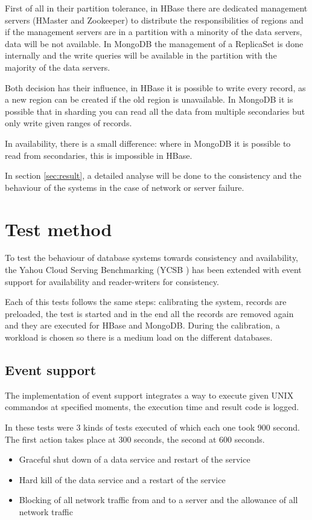 \documentclass[final,5p,times]{elsarticle}
\begin{document}
First of all in their partition tolerance, in HBase there are dedicated management servers (HMaster and Zookeeper) to distribute the responsibilities of regions and if the management servers are in a partition with a minority of the data servers, data will be not available. In MongoDB the management of a ReplicaSet is done internally and the write queries will be available in the partition with the majority of the data servers.

Both decision has their influence, in HBase it is possible to write every record, as a new region can be created if the old region is unavailable. In MongoDB it is possible that in sharding you can read all the data from multiple secondaries but only write given ranges of records.

In availability, there is a small difference: where in MongoDB it is possible to read from secondaries, this is impossible in HBase. 

In section \ref{sec:result}, a detailed analyse will be done to the consistency and the behaviour of the systems in the case of network or server failure. 

\section{Test method}
To test the behaviour of database systems towards consistency and availability, the Yahou Cloud Serving Benchmarking (YCSB \cite{cooper2010benchmarking}) has been extended with event support for availability and reader-writers for consistency.

Each of this tests follows the same steps: calibrating the system, records are preloaded, the test is started and in the end all the records are removed again and they are executed for HBase and MongoDB. During the calibration, a workload is chosen so there is a medium load on the different databases. 

\subsection{Event support}
The implementation of event support integrates a way to execute given UNIX commandos at specified moments, the execution time and result code is logged. 

In these tests were 3 kinds of tests executed of which each one took 900 second. The first action takes place at 300 seconds, the second at 600 seconds.
\begin{itemize}
\item Graceful shut down of a data service and restart of the service
\item Hard kill of the data service and a restart of the service
\item Blocking of all network traffic from and to a server and the allowance of all network traffic
\end{itemize}
\end{document}
